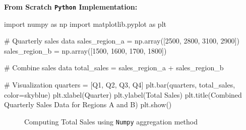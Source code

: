 \documentclass[
  letterpaper,
  DIV=11,
  numbers=noendperiod]{scrreprt}
\newenvironment{Shaded}{\begin{snugshade}}{\end{snugshade}}
\newcommand{\CommentTok}[1]{\textcolor[rgb]{0.37,0.37,0.37}{#1}}
\newcommand{\DecValTok}[1]{\textcolor[rgb]{0.68,0.00,0.00}{#1}}
\newcommand{\ImportTok}[1]{\textcolor[rgb]{0.00,0.46,0.62}{#1}}
\newcommand{\NormalTok}[1]{\textcolor[rgb]{0.00,0.23,0.31}{#1}}
\newcommand{\OperatorTok}[1]{\textcolor[rgb]{0.37,0.37,0.37}{#1}}
\newcommand{\StringTok}[1]{\textcolor[rgb]{0.13,0.47,0.30}{#1}}
\theoremstyle{plain}
\theoremstyle{definition}
\theoremstyle{remark}
\begin{document}
\textbf{From Scratch \texttt{Python} Implementation:}

\begin{Shaded}
\begin{Highlighting}[]
\ImportTok{import}\NormalTok{ numpy }\ImportTok{as}\NormalTok{ np}
\ImportTok{import}\NormalTok{ matplotlib.pyplot }\ImportTok{as}\NormalTok{ plt}

\CommentTok{\# Quarterly sales data}
\NormalTok{sales\_region\_a }\OperatorTok{=}\NormalTok{ np.array([}\DecValTok{2500}\NormalTok{, }\DecValTok{2800}\NormalTok{, }\DecValTok{3100}\NormalTok{, }\DecValTok{2900}\NormalTok{])}
\NormalTok{sales\_region\_b }\OperatorTok{=}\NormalTok{ np.array([}\DecValTok{1500}\NormalTok{, }\DecValTok{1600}\NormalTok{, }\DecValTok{1700}\NormalTok{, }\DecValTok{1800}\NormalTok{])}

\CommentTok{\# Combine sales data}
\NormalTok{total\_sales }\OperatorTok{=}\NormalTok{ sales\_region\_a }\OperatorTok{+}\NormalTok{ sales\_region\_b}

\CommentTok{\# Visualization}
\NormalTok{quarters }\OperatorTok{=}\NormalTok{ [}\StringTok{\textquotesingle{}Q1\textquotesingle{}}\NormalTok{, }\StringTok{\textquotesingle{}Q2\textquotesingle{}}\NormalTok{, }\StringTok{\textquotesingle{}Q3\textquotesingle{}}\NormalTok{, }\StringTok{\textquotesingle{}Q4\textquotesingle{}}\NormalTok{]}
\NormalTok{plt.bar(quarters, total\_sales, color}\OperatorTok{=}\StringTok{\textquotesingle{}skyblue\textquotesingle{}}\NormalTok{)}
\NormalTok{plt.xlabel(}\StringTok{\textquotesingle{}Quarter\textquotesingle{}}\NormalTok{)}
\NormalTok{plt.ylabel(}\StringTok{\textquotesingle{}Total Sales\textquotesingle{}}\NormalTok{)}
\NormalTok{plt.title(}\StringTok{\textquotesingle{}Combined Quarterly Sales Data for Regions A and B\textquotesingle{}}\NormalTok{)}
\NormalTok{plt.show()}
\end{Highlighting}
\end{Shaded}

\begin{figure}[H]


\caption{\label{fig-total1}Computing Total Sales using \texttt{Numpy}
aggregation method}

\end{figure}%
\end{document}
